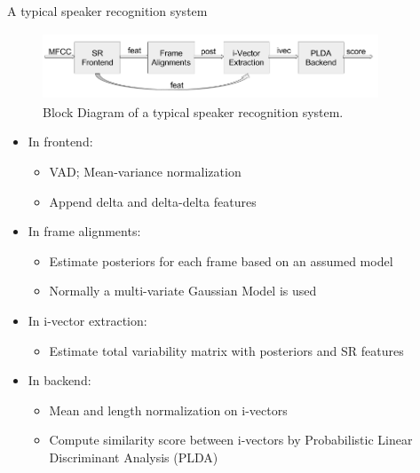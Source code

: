\documentclass{beamer}
\begin{document}
\begin{frame}{A typical speaker recognition system}
  \begin{figure}
      \centering
      \includegraphics[width=10cm, height=2cm]{figures/SR_blockdiagram.png}
      \vspace{-4pt}
      \caption{Block Diagram of a typical speaker recognition system.}
      \label{fig:blck_sr}
  \end{figure}
  \vspace{-15pt}
  \begin{itemize}
  
  \item{ In frontend:
  \begin{itemize}
      \item VAD; Mean-variance normalization
      \item Append delta and delta-delta features
  \end{itemize}
  }
  
   \item{In frame alignments:
  \begin{itemize}
      \item Estimate posteriors for each frame based on an assumed model
      \item Normally a multi-variate Gaussian Model is used
  \end{itemize}
  }
  
   \item{In i-vector extraction:
  \begin{itemize}
      \item Estimate total variability matrix with posteriors and SR features
  \end{itemize}
  }
  
   \item{In backend:
  \begin{itemize}
      \item Mean and length normalization on i-vectors
      \item Compute similarity score between i-vectors by Probabilistic Linear Discriminant Analysis (PLDA)
  \end{itemize}
  }
   \end{itemize}
\end{frame}
\end{document}
